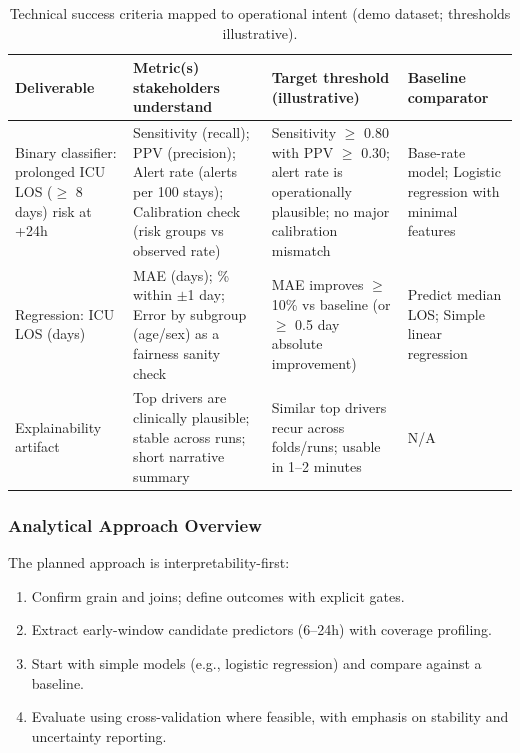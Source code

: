 \documentclass[12pt]{article}
\begin{document}
\setlength{\tabcolsep}{4pt}
\renewcommand{\arraystretch}{1.1}
\begin{table}[H]
\centering
\small
\caption{Technical success criteria mapped to operational intent (demo dataset; thresholds illustrative).}
\begin{tabular}{@{}L{3.6cm}L{3.7cm}L{2.7cm}L{3.0cm}@{}}
\toprule
Deliverable & Metric(s) stakeholders understand & Target threshold (illustrative) & Baseline comparator \\
\midrule
Binary classifier: prolonged ICU LOS ($\ge$ 8 days) risk at +24h
& Sensitivity (recall); PPV (precision); Alert rate (alerts per 100 stays); \newline Calibration check (risk groups vs observed rate)
& Sensitivity $\ge$ 0.80 with PPV $\ge$ 0.30; \newline alert rate is operationally plausible; \newline no major calibration mismatch
& Base-rate model; \newline Logistic regression with minimal features \\
\addlinespace
Regression: ICU LOS (days)
& MAE (days); \% within $\pm$1 day; \newline Error by subgroup (age/sex) as a fairness sanity check
& MAE improves $\ge$ 10\% vs baseline \newline (or $\ge$ 0.5 day absolute improvement)
& Predict median LOS; \newline Simple linear regression \\
\addlinespace
Explainability artifact
& Top drivers are clinically plausible; stable across runs; short narrative summary
& Similar top drivers recur across folds/runs; \newline usable in 1--2 minutes
& N/A \\
\bottomrule
\end{tabular}
\end{table}

\subsubsection*{Analytical Approach Overview}
The planned approach is interpretability-first:
\begin{enumerate}[leftmargin=1.5em]
    \item Confirm grain and joins; define outcomes with explicit gates.
    \item Extract early-window candidate predictors (6--24h) with coverage profiling.
    \item Start with simple models (e.g., logistic regression) and compare against a baseline.
    \item Evaluate using cross-validation where feasible, with emphasis on stability and uncertainty reporting.
\end{enumerate}
\end{document}

